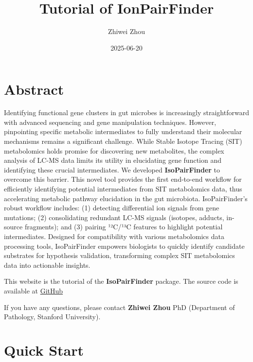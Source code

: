 \documentclass[
  letterpaper,
  DIV=11,
  numbers=noendperiod]{scrreprt}
\title{Tutorial of IonPairFinder}
\author{Zhiwei Zhou}
\date{2025-06-20}
\renewcommand*\contentsname{Table of contents}
\newcommand\contentsname{Table of contents}
\begin{document}
\maketitle

\renewcommand*\contentsname{Table of contents}
{
\hypersetup{linkcolor=}
\setcounter{tocdepth}{2}
\tableofcontents
}


\chapter*{Abstract}\label{abstract}


Identifying functional gene clusters in gut microbes is increasingly
straightforward with advanced sequencing and gene manipulation
techniques. However, pinpointing specific metabolic intermediates to
fully understand their molecular mechanisms remains a significant
challenge. While Stable Isotope Tracing (SIT) metabolomics holds promise
for discovering new metabolites, the complex analysis of LC-MS data
limits its utility in elucidating gene function and identifying these
crucial intermediates. We developed \textbf{IsoPairFinder} to overcome
this barrier. This novel tool provides the first end-to-end workflow for
efficiently identifying potential intermediates from SIT metabolomics
data, thus accelerating metabolic pathway elucidation in the gut
microbiota. IsoPairFinder's robust workflow includes: (1) detecting
differential ion signals from gene mutations; (2) consolidating
redundant LC-MS signals (isotopes, adducts, in-source fragments); and
(3) pairing ¹²C/¹³C features to highlight potential intermediates.
Designed for compatibility with various metabolomics data processing
tools, IsoPairFinder empowers biologists to quickly identify candidate
substrates for hypothesis validation, transforming complex SIT
metabolomics data into actionable insights.

This website is the tutorial of the \textbf{IsoPairFinder} package. The
source code is available at
\href{https://github.com/DoddLab/IsoPairFinder}{GitHub}

If you have any questions, please contact \textbf{Zhiwei Zhou} PhD
(Department of Pathology, Stanford University).


\chapter{Quick Start}\label{sec-quick-start}
\end{document}
